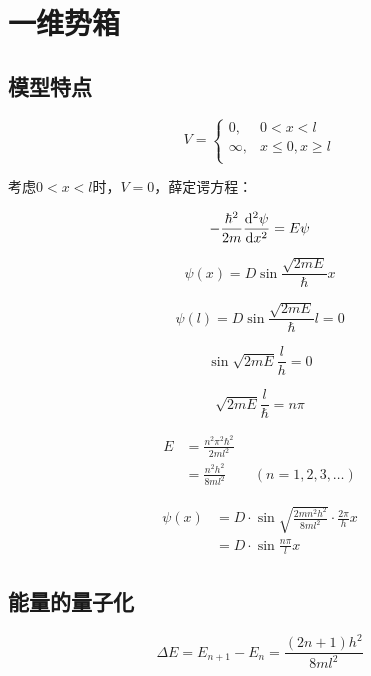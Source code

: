 

\section{一维势箱}

\subsection{模型特点}

\[
    V = \begin{cases}
        0, & 0 < x < l \\
        \infty, & x \le 0, x \ge l \\
    \end{cases} 
\]

考虑$0 < x < l$时，$V=0$，薛定谔方程：

\[
    -\frac{\hbar^2}{2m} \frac{\mathrm{d}^2 \psi}{\mathrm{d} x^2} = E \psi
\]

\[
    \psi(x) = D \sin \frac{\sqrt{2mE}}{\hbar} x   
\]

\[
    \psi(l) = D \sin \frac{\sqrt{2mE}}{\hbar} l = 0
\]

\[
    \sin \sqrt{2mE} \frac{l}{h} = 0
\]

\[
    \sqrt{2mE} \frac{l}{\hbar} = n \pi 
\]

\begin{align*}
    E &= \frac{n^2\pi^2\hbar^2}{2ml^2} \\
    &= \frac{n^2h^2}{8ml^2} \qquad (n = 1, 2, 3, \dots)
\end{align*}

\begin{align*}
    \psi (x) &= D \cdot \sin \sqrt{\frac{2mn^2h^2}{8ml^2} } \cdot \frac{2\pi}{h} x \\
    &= D \cdot \sin \frac{n\pi}{l} x
\end{align*}

\subsection{能量的量子化}

\[
    \Delta E = E_{n + 1} - E_n = \frac{(2n + 1)h^2}{8ml^2}  
\]

